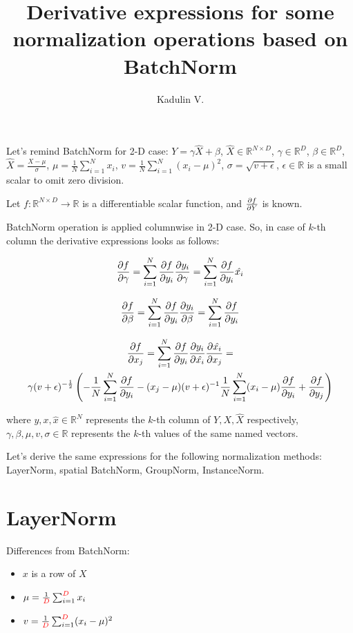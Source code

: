 \documentclass[12pt]{article}
\begin{document}
\title{Derivative expressions for some normalization operations based on BatchNorm}
\author{Kadulin V.}
\maketitle

Let's remind BatchNorm for 2-D case: 
$Y = \gamma \hat{X} + \beta$, 
$\hat{X} \in \mathbb{R}^{N \times D}$, 
$\gamma \in \mathbb{R}^D$, 
$\beta \in \mathbb{R}^D$, 
$\hat{X} = \frac{X - \mu}{\sigma}$,  
$\mu = \frac{1}{N} \sum_{i=1}^{N} x_{i}$,
$v = \frac{1}{N} \sum_{i=1}^{N} (x_i - \mu)^2$,
$\sigma = \sqrt{v + \epsilon}$,
$\epsilon \in \mathbb{R}$ is a small scalar to omit zero division. 

Let $f: \mathbb{R}^{N \times D} \rightarrow \mathbb{R}$ is a differentiable scalar function, and $\pdv{f}{Y}$ is known.

BatchNorm operation is applied columnwise in 2-D case. So, in case of $k$-th column the derivative expressions looks as follows:

\[
	\pdv{f}{\gamma} = 
	\sum_{i=1}^{N} \pdv{f}{y_i} \pdv{y_i}{\gamma} = 
	\sum_{i=1}^{N} \pdv{f}{y_i} \hat{x_i}
\]

\[
	\pdv{f}{\beta} = 
	\sum_{i=1}^{N} \pdv{f}{y_i} \pdv{y_i}{\beta} =
	\sum_{i=1}^{N} \pdv{f}{y_i}
\]

\begin{gather*}
\pdv{f}{x_j} = 
	\sum_{i=1}^{N} \pdv{f}{y_i} \pdv{y_i}{\hat{x_i}} \pdv{\hat{x_i}}{x_j} = \\
	\gamma (v + \epsilon)^{-\frac{1}{2}} 
	\left(	
		- \frac{1}{N} \sum_{i=1}^{N} \pdv{f}{y_i}
		- (x_j - \mu) (v + \epsilon)^{-1} \frac{1}{N} \sum_{i=1}^{N} (x_i - \mu) \pdv{f}{y_i} 
		+ \pdv{f}{y_j}
	\right)
\end{gather*}

where $y, x, \hat{x} \in \mathbb{R}^N$ represents the $k$-th column of $Y, X, \hat{X}$ respectively, $\gamma, \beta, \mu, v, \sigma \in \mathbb{R}$ represents the $k$-th values of the same named vectors.

Let's derive the same expressions for the following normalization methods: LayerNorm, spatial BatchNorm, GroupNorm, InstanceNorm.

\section*{LayerNorm}

Differences from BatchNorm:

\begin{itemize}
\item $x$ is a row of $X$
\item $\mu = \frac{1}{\begingroup\color{red} D \endgroup} 
\sum_{i=1}^{\begingroup\color{red} D \endgroup} x_{i}$
\item $v = \frac{1}{\begingroup\color{red} D \endgroup} 
\sum_{i=1}^{\begingroup\color{red} D \endgroup} (x_i - \mu)^2$
\end{itemize}
\end{document}
